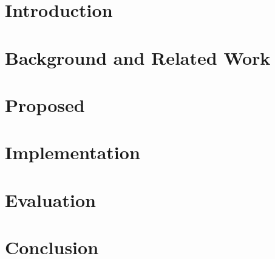 
\chapter{Introduction}\label{chapter:introduction}
\graphicspath{{Manuscript/}}


\chapter{Background and Related Work}\label{chapter:related}
\graphicspath{{Manuscript/}}



\chapter{Proposed}\label{chapter:proposed}
\graphicspath{{Manuscript/}}


\chapter{Implementation}\label{chapter:implemetation}
\graphicspath{{Manuscript/}}



\chapter{Evaluation}\label{chapter:evaluation}
\graphicspath{{Manuscript/}}



\chapter{Conclusion}\label{chapter:conclusion}
\graphicspath{{Manuscript/}}


